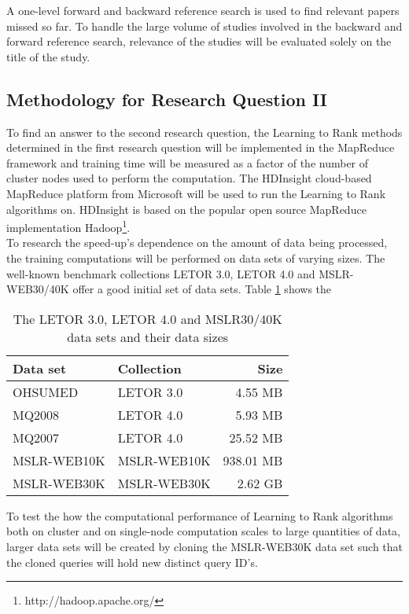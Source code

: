 A one-level forward and backward reference search is used to find relevant papers missed so far. To handle the large volume of studies involved in the backward and forward reference search, relevance of the studies will be evaluated solely on the title of the study.\\

\subsection{Methodology for Research Question II}
\label{ssec:rq2_methodology}
To find an answer to the second research question, the Learning to Rank methods determined in the first research question will be implemented in the MapReduce framework and training time will be measured as a factor of the number of cluster nodes used to perform the computation. The HDInsight cloud-based MapReduce platform from Microsoft will be used to run the Learning to Rank algorithms on. HDInsight is based on the popular open source MapReduce implementation Hadoop\footnote{http://hadoop.apache.org/}.\\

To research the speed-up's dependence on the amount of data being processed, the training computations will be performed on data sets of varying sizes. The well-known benchmark collections LETOR 3.0, LETOR 4.0 and MSLR-WEB30/40K offer a good initial set of data sets. Table \ref{tbl:initial_datasets} shows the
\begin{table}[!h]
\centering
\begin{tabular}{p{3.4cm}p{3.4cm}r}\toprule
Data set & Collection & Size \\
\midrule
OHSUMED     & LETOR 3.0       &   4.55 MB\\
MQ2008      & LETOR 4.0       &   5.93 MB\\
MQ2007      & LETOR 4.0       &  25.52 MB\\
MSLR-WEB10K & MSLR-WEB10K     & 938.01 MB\\
MSLR-WEB30K & MSLR-WEB30K     &   2.62 GB\\
\bottomrule
\end{tabular}
\caption{The LETOR 3.0, LETOR 4.0 and MSLR30/40K data sets and their data sizes}
\label{tbl:initial_datasets}
\end{table}

To test the how the computational performance of Learning to Rank algorithms both on cluster and on single-node computation scales to large quantities of data, larger data sets will be created by cloning the MSLR-WEB30K data set such that the cloned queries will hold new distinct query ID's.
